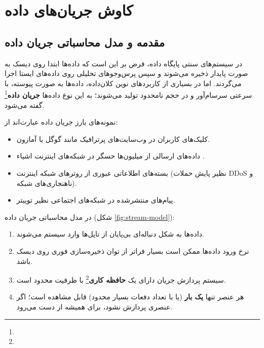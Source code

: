 \chapter{کاوش جریان‌های داده \texorpdfstring{}{(Data Streams)}}
\label{ch:data-streams}

\section{مقدمه و مدل محاسباتی جریان داده}
در سیستم‌های سنتی پایگاه داده، فرض بر این است که داده‌ها ابتدا روی دیسک به صورت پایدار ذخیره می‌شوند و سپس پرس‌وجوهای تحلیلی روی داده‌های ایستا اجرا می‌گردند. اما در بسیاری از کاربردهای نوین کلان‌داده، داده‌ها به صورت پیوسته، با سرعتی سرسام‌آور و در حجم نامحدود تولید می‌شوند؛ به این نوع داده‌ها \textbf{جریان داده}\footnote{} گفته می‌شود.

نمونه‌های بارز جریان داده عبارت‌اند از:
\begin{itemize}
    \item کلیک‌های کاربران در وب‌سایت‌های پرترافیک مانند گوگل یا آمازون.
    \item داده‌های ارسالی از میلیون‌ها حسگر در شبکه‌های اینترنت اشیاء .
    \item بسته‌های اطلاعاتی عبوری از روترهای شبکه اینترنت (نظیر پایش حملات DDoS و ناهنجاری‌های شبکه).
    \item پیام‌های منتشرشده در شبکه‌های اجتماعی نظیر توییتر.
\end{itemize}

\begin{definition}
در مدل محاسباتی جریان داده (شکل \ref{fig:stream-model}):
\begin{enumerate}
    \item داده‌ها به شکل دنباله‌ای بی‌پایان از تاپل‌ها وارد سیستم می‌شوند.
    \item نرخ ورود داده‌ها ممکن است بسیار فراتر از توان ذخیره‌سازی فوری روی دیسک باشد.
    \item سیستم پردازش جریان دارای یک \textbf{حافظه کاری}\footnote{} با ظرفیت محدود است.
    \item هر عنصر تنها \textbf{یک بار} (یا با تعداد دفعات بسیار محدود) قابل مشاهده است؛ اگر عنصری پردازش نشود، برای همیشه از دست می‌رود.
\end{enumerate}
\end{definition}

